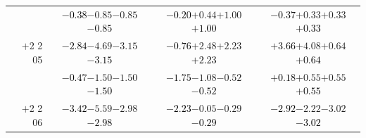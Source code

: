 \documentclass[compress]{beamer}
\begin{document}
\begin{frame}
\begin{tabular}{r | c | c | c}
          & \textcolor{black}{$-0.38$}\hspace{0.1 cm}$-0.85$\hspace{0.1 cm}$-0.85$\hspace{0.1 cm}\textcolor{black}{$-0.85$} & \textcolor{black}{$-0.20$}\hspace{0.1 cm}$+0.44$\hspace{0.1 cm}$+1.00$\hspace{0.1 cm}\textcolor{black}{$+1.00$} & \textcolor{black}{$-0.37$}\hspace{0.1 cm}$+0.33$\hspace{0.1 cm}$+0.33$\hspace{0.1 cm}\textcolor{black}{$+0.33$} \\
$+$2 2 05 & \textcolor{black}{$-2.84$}\hspace{0.1 cm}$-4.69$\hspace{0.1 cm}$-3.15$\hspace{0.1 cm}\textcolor{black}{$-3.15$} & \textcolor{black}{$-0.76$}\hspace{0.1 cm}$+2.48$\hspace{0.1 cm}$+2.23$\hspace{0.1 cm}\textcolor{black}{$+2.23$} & \textcolor{black}{$+3.66$}\hspace{0.1 cm}$+4.08$\hspace{0.1 cm}$+0.64$\hspace{0.1 cm}\textcolor{black}{$+0.64$} \\
          & \textcolor{black}{$-0.47$}\hspace{0.1 cm}$-1.50$\hspace{0.1 cm}$-1.50$\hspace{0.1 cm}\textcolor{black}{$-1.50$} & \textcolor{black}{$-1.75$}\hspace{0.1 cm}$-1.08$\hspace{0.1 cm}$-0.52$\hspace{0.1 cm}\textcolor{black}{$-0.52$} & \textcolor{black}{$+0.18$}\hspace{0.1 cm}$+0.55$\hspace{0.1 cm}$+0.55$\hspace{0.1 cm}\textcolor{black}{$+0.55$} \\
$+$2 2 06 & \textcolor{black}{$-3.42$}\hspace{0.1 cm}$-5.59$\hspace{0.1 cm}$-2.98$\hspace{0.1 cm}\textcolor{black}{$-2.98$} & \textcolor{black}{$-2.23$}\hspace{0.1 cm}$-0.05$\hspace{0.1 cm}$-0.29$\hspace{0.1 cm}\textcolor{black}{$-0.29$} & \textcolor{black}{$-2.92$}\hspace{0.1 cm}$-2.22$\hspace{0.1 cm}$-3.02$\hspace{0.1 cm}\textcolor{black}{$-3.02$} \\

\end{tabular}
\end{frame}
\end{document}
